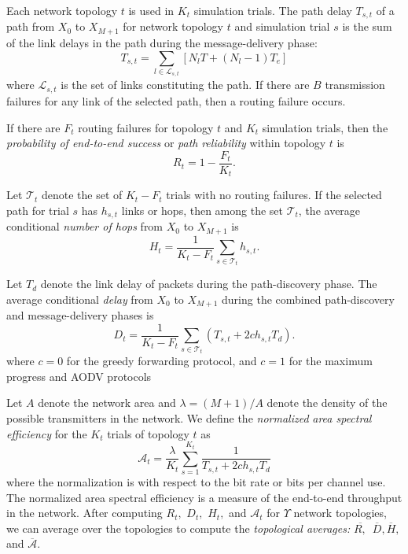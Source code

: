 \documentclass[conference]{IEEEtran}
\begin{document}
Each network topology $t$ is used in $K_t$ simulation trials. The
path delay $T_{s,t}$ of a path from
$X_0$ to $X_{M+1}$ for network topology $t$
and simulation trial $s$ is the sum
of the link delays in the path during the message-delivery
phase:
\begin{equation}
T_{s,t}=\sum\limits_{l\in\mathcal{L}_{s,t}}[N_{l}T+(N_{l}-1)T_{e}]
\end{equation}
where $\mathcal{L}_{s,t}$ is the set of links constituting the path.
If there are $B$ transmission failures for any link of the
selected path, then a routing failure occurs.


If there are $F_{t}$ routing failures for topology $t$ and $K_{t}$ simulation
trials, then the \emph{probability of end-to-end success} or \emph{path}
\emph{reliability} within topology $t$ is
\begin{equation}
R_{t}=1-\frac{F_{t}}{K_{t}}. \label{13}\end{equation}

Let $\mathcal{T}_{t}$ denote the set of
$K_{t}-F_{t}$ trials with no routing failures. If the selected path for trial $s$ has $h_{s,t}$ links or hops, then among the set
$\mathcal{T}_{t}$, the average conditional
\emph{number of hops}
from $X_{0}$ to $X_{M+1}$ is
\begin{equation}
H_{t}=\frac{1}{K_{t}-F_{t}}\sum\limits_{s\in\mathcal{T}_{t}}h_{s,t}.
\end{equation}

Let ${T}_{d}$ denote the link delay of packets during the path-discovery phase. The average conditional
\emph{delay} from $X_{0}$ to $X_{M+1}$
during the combined path-discovery and
message-delivery phases is
\begin{equation}
D_{t}=\frac{1}{K_{t}-F_{t}}\sum\limits_{s\in\mathcal{T}_{t}}\left(T_{s,t} + 2 c h_{s,t} T_{d}\right).
\end{equation}
where $c=0$ for the greedy forwarding protocol, and $c=1$ for the maximum progress and AODV protocols

Let $A$ denote the network area and $\lambda=(M+1)/A$ denote the density of
the possible transmitters in the network. We define the \emph{normalized}
\emph{area spectral efficiency} for the $K_{t}$ trials of topology $t$ as
\begin{equation}
\mathcal{A}_{t}=\frac{\lambda}{K_{t}}\sum\limits_{s=1}^{K_{t}}\frac{1}{T_{s,t}+ 2 c h_{s,t} T_{d}}\end{equation}
where the normalization is with respect to the bit rate or bits per channel use. The normalized area spectral
efficiency is a measure of the end-to-end throughput in the network. After
computing $R_{t},$ $D_{t},$ $H_{t},$ and $\mathcal{A}_{t}$ for $\Upsilon$
network topologies, we can average over the topologies to compute the \emph{topological averages: }$\overline{R,}$\ $\overline{D},\overline{\text{
}H},$ and $\overline{\mathcal{A}}.$
\end{document}
